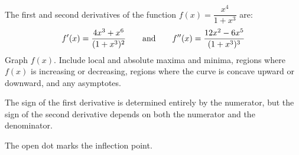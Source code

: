 \begin{question}[1997A]
The first and second derivatives of the function $f(x)=\dfrac{x^4}{1+x^3}$ are:
$$
f'(x)=\frac{4x^3+x^6}{(1+x^3)^2}\qquad\hbox{and}\qquad f''(x)=\frac{12x^2-6x^5}{(1+x^3)^3}
$$
Graph $f(x)$. Include local
and absolute maxima and minima, regions where $f(x)$ is increasing or
decreasing, regions where the curve is concave upward
or downward, and any asymptotes.
\end{question}
\begin{hint}
The sign of the first derivative is determined entirely by the numerator, but the sign of the second derivative depends on both the numerator and the denominator.
\end{hint}
\begin{answer}
The open dot marks the inflection point.
\begin{center}\end{center}
\end{answer}
